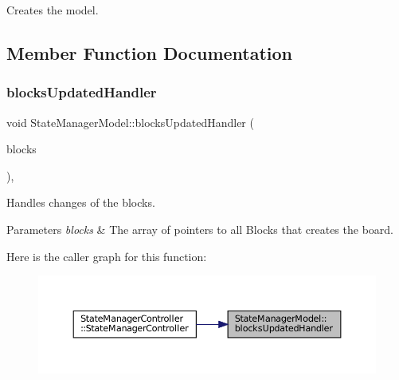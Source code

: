 Creates the model. 



\subsection{Member Function Documentation}
\mbox{\label{class_state_manager_model_a51df218169f899e063572ca5df5a388b}} 
\subsubsection{\texorpdfstring{blocksUpdatedHandler}{blocksUpdatedHandler}}
{\footnotesize\ttfamily void State\+Manager\+Model\+::blocks\+Updated\+Handler (\begin{DoxyParamCaption}\item[{const std\+::vector$<$ std\+::shared\+\_\+ptr$<$ \mbox{\hyperlink{class_block}{Block}}$<$ \mbox{\hyperlink{class_block_layout_item}{Block\+Layout\+Item}} $>$$>$$>$ \&}]{blocks }\end{DoxyParamCaption})\hspace{0.3cm}{\ttfamily [inline]}, {\ttfamily [slot]}}



Handles changes of the blocks. 


\begin{DoxyParams}{Parameters}
{\em blocks} & The array of pointers to all Blocks that creates the board. \\
\hline
\end{DoxyParams}
Here is the caller graph for this function\+:
\nopagebreak
\begin{figure}[H]
\begin{center}
\leavevmode
\includegraphics[width=350pt]{class_state_manager_model_a51df218169f899e063572ca5df5a388b_icgraph}
\end{center}
\end{figure}
\mbox{\label{class_state_manager_model_a414fe4dfa55aa139c26b3ccd002328ff}} 
